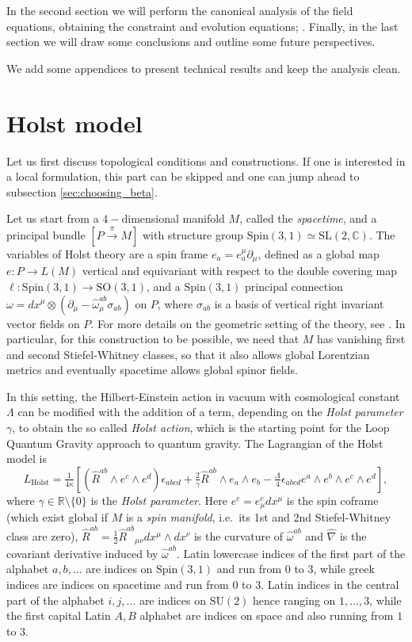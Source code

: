 \documentclass[a4paper, 11pt]{article}
\def\R{\mathbb{R}}
\def\C{\mathbb{C}}
\def\ga{\gamma}
\def\ep{\epsilon}
\def\ka{\kappa}
\def\si{\sigma}
\def\om{\omega}
\def\La{\Lambda}
\def\na{\nabla}
\def\pa{\partial}
\def\we{\wedge}
\def\SU(#1){\mathrm{SU}(#1)}
\def\SL(#1){\mathrm{SL}(#1)}
\def\SO(#1){\mathrm{SO}(#1)}
\def\Spin(#1){\mathrm{Spin}(#1)}
\numberwithin{equation}{section}
\begin{document}
In the second section we will perform the canonical analysis of the field equations, obtaining the constraint and evolution equations; \cite{Fatibene:2015ita,Fatibene:2016usr}. Finally, in the last section we will draw some conclusions and outline some future perspectives.

We add some appendices to present technical results and keep the analysis clean.


\section{Holst model}

Let us first discuss topological conditions and constructions. If one is interested in a local formulation, this part can be skipped and one can jump ahead to subsection \ref{sec:choosing_beta}.

Let us start from a $4-$dimensional manifold $M$, called the \textit{spacetime}, and a principal bundle $[P \xrightarrow{\pi} M]$ with structure group $\Spin(3,1)\simeq \SL(2, \C)$. The variables of Holst theory are a spin frame $e_a = e_a^\mu \pa_\mu$, defined as a global map $e: P \to L(M)$ vertical and equivariant with respect to the double covering map $\ell: \Spin(3,1) \to \SO(3,1)$, and a $\Spin(3,1)$ principal connection $\om = dx^\mu \otimes \left(\pa_\mu - \hat \om^{ab}_\mu\si_{ab}\right)$ on $P$, where $\si_{ab}$ is a basis of vertical right invariant vector fields on $P$. For more details on the geometric setting of the theory, see \cite{fatibeneLectureNotes1}.
In particular, for this construction to be possible, we need that $M$ has vanishing first and second Stiefel-Whitney classes, so that it also allows global Lorentzian metrics and eventually spacetime allows global spinor fields.

In this setting, the Hilbert-Einstein action in vacuum with cosmological constant $\La$ can be modified with the addition of a term, depending on the {\it Holst parameter} $\ga$, to obtain the so called \textit{Holst action}, which is the starting point for the Loop Quantum Gravity approach to quantum gravity. The Lagrangian of the Holst model is
\begin{equation}
L _\text{Holst}= \tfrac 1 {4\ka} \left[ (\hat R^{ab} \we e^c \we e^d)\ep_{abcd} + \tfrac 2 \ga \hat R^{ab} \we e_a \we e_b - \tfrac \La 4 \ep_{abcd} e^a\we e^b \we e^c \we e^d \right],
\label{eq:holst_lagrangian}
\end{equation}  
where $\ga \in \R \setminus \{0\}$ is the \textit{Holst parameter}.
Here $e^c = e^c_\mu dx^\mu$ is the spin coframe (which exist global if $M$ is a {\it spin manifold}, i.e.~its 1st and 2nd Stiefel-Whitney class are zero), $\hat R^{ab} = \tfrac 1 2 \hat R^{ab}{}_{\mu\nu}dx^\mu \we dx^\nu$ is the curvature of $\hat \om^{ab}$ and $\hat \na$ is the covariant derivative induced by $\hat \om^{ab}$. Latin lowercase indices of the first part of the alphabet $a, b, \ldots$ are indices on $\Spin(3,1)$ and run from $0$ to $3$, while greek indices are indices on spacetime and run from $0$ to $3$. Latin indices in the central part of the alphabet $i, j, \ldots$ are indices on $\SU(2)$ hence ranging on $1,\ldots, 3$,
while the first capital Latin $A, B$ alphabet are indices  on space and also running from $1$ to $3$.
\end{document}
